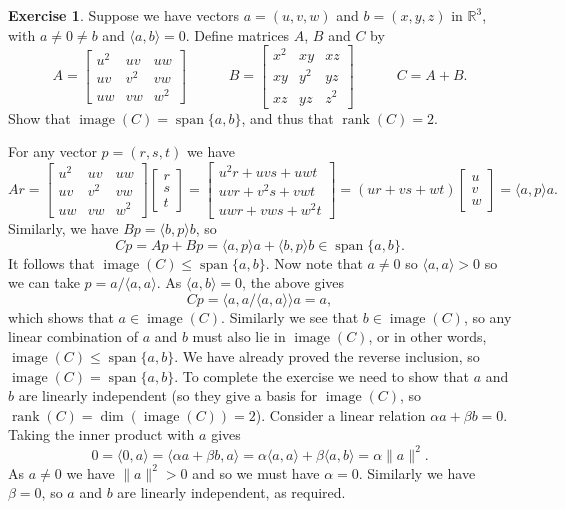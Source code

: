 \documentclass[a4paper]{amsart}
\newcommand{\R}         {{\mathbb{R}}}
\newcommand{\bpm}       {\left[\begin{matrix}}
\newcommand{\epm}       {\end{matrix}\right]}
\newcommand{\ip}[1]     {\langle #1\rangle}
\newcommand{\al}        {\alpha}
\newcommand{\bt}        {\beta}
\newcommand{\rank}      {\operatorname{rank}}
\newcommand{\img}       {\operatorname{image}}
\newcommand{\spn}       {\operatorname{span}}
\renewcommand{\:}{\colon}
\theoremstyle{definition}
\newtheorem{exercise}{Exercise}
\newenvironment{solution}{{\noindent \bf Solution:}}{}
\begin{document}
\begin{exercise}
 Suppose we have vectors $a=(u,v,w)$ and $b=(x,y,z)$ in
 $\R^3$, with $a\neq 0\neq b$ and $\ip{a,b}=0$.  Define
 matrices $A$, $B$ and $C$ by
 \[ 
  A = \bpm u^2 & uv & uw \\ uv & v^2 & vw \\ uw & vw & w^2 \epm
  \hspace{3em}
  B = \bpm x^2 & xy & xz \\ xy & y^2 & yz \\ xz & yz & z^2 \epm
  \hspace{3em}
  C = A+B.
 \]
 Show that $\img(C)=\spn\{a,b\}$, and thus that $\rank(C)=2$.
\end{exercise}
\begin{solution}
 For any vector $p=(r,s,t)$ we have
 \[ Ar =
    \bpm u^2 & uv & uw \\ uv & v^2 & vw \\ uw & vw & w^2 \epm
    \bpm r \\ s \\ t \epm =
    \bpm u^2r+uvs+uwt \\ uvr+v^2s+vwt \\ uwr+vws+w^2t \epm = 
    (ur+vs+wt) \bpm u \\ v \\ w \epm = \ip{a,p} a.
 \]
 Similarly, we have $Bp=\ip{b,p}b$, so 
 \[ Cp = Ap + Bp = \ip{a,p}a + \ip{b,p}b \in\spn\{a,b\}. \]
 It follows that $\img(C)\leq\spn\{a,b\}$.  Now note that
 $a\neq 0$ so $\ip{a,a}>0$ so we can take $p=a/\ip{a,a}$.
 As $\ip{a,b}=0$, the above gives 
 \[ Cp = \ip{a,a/\ip{a,a}} a = a, \]
 which shows that $a\in\img(C)$.  Similarly we see that
 $b\in\img(C)$, so any linear combination of $a$ and $b$
 must also lie in $\img(C)$, or in other words,
 $\img(C)\leq\spn\{a,b\}$.  We have already proved the
 reverse inclusion, so $\img(C)=\spn\{a,b\}$.  To complete
 the exercise we need to show that $a$ and $b$ are linearly
 independent (so they give a basis for $\img(C)$, so
 $\rank(C)=\dim(\img(C))=2$).  Consider a linear relation
 $\al a+\bt b=0$.  Taking the inner product with $a$ gives
 \[ 0=\ip{0,a}=\ip{\al a+\bt b,a} = \al\ip{a,a}+\bt\ip{a,b} 
     = \al\|a\|^2.
 \]
 As $a\neq 0$ we have $\|a\|^2>0$ and so we must have
 $\al=0$.  Similarly we have $\bt=0$, so $a$ and $b$ are
 linearly independent, as required.
\end{solution}
\end{document}
